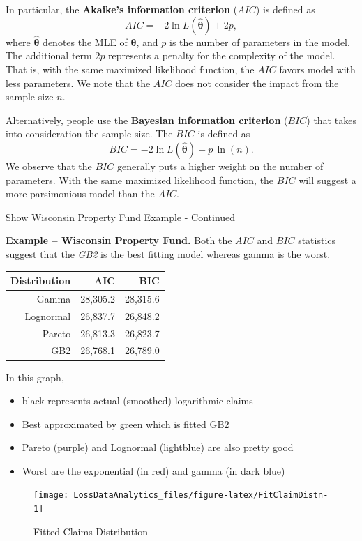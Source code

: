 \documentclass[]{book}
\theoremstyle{definition}
\theoremstyle{definition}
\theoremstyle{definition}
\theoremstyle{remark}
\begin{document}
In particular, the \textbf{Akaike's information criterion} (\(AIC\)) is
defined as \[AIC = -2\ln L(\hat{\boldsymbol \theta}) + 2p,\] where
\(\hat{\boldsymbol \theta}\) denotes the MLE of
\({\boldsymbol \theta}\), and \(p\) is the number of parameters in the
model. The additional term \(2 p\) represents a penalty for the
complexity of the model. That is, with the same maximized likelihood
function, the \(AIC\) favors model with less parameters. We note that
the \(AIC\) does not consider the impact from the sample size \(n\).

Alternatively, people use the \textbf{Bayesian information criterion}
(\(BIC\)) that takes into consideration the sample size. The \(BIC\) is
defined as \[BIC = -2\ln L(\hat{\boldsymbol \theta}) + p\,\ln(n).\] We
observe that the \(BIC\) generally puts a higher weight on the number of
parameters. With the same maximized likelihood function, the \(BIC\)
will suggest a more parsimonious model than the \(AIC\).

Show Wisconsin Property Fund Example - Continued

\hypertarget{EXM:S1:AIC}{}
\textbf{Example -- Wisconsin Property Fund.} Both the \(AIC\) and
\(BIC\) statistics suggest that the \emph{GB2} is the best fitting model
whereas gamma is the worst.

\begin{longtable}[]{@{}rrr@{}}
\toprule
Distribution & AIC & BIC\tabularnewline
\midrule
\endhead
Gamma & 28,305.2 & 28,315.6\tabularnewline
Lognormal & 26,837.7 & 26,848.2\tabularnewline
Pareto & 26,813.3 & 26,823.7\tabularnewline
GB2 & 26,768.1 & 26,789.0\tabularnewline
\bottomrule
\end{longtable}

In this graph,

\begin{itemize}
\item
  black represents actual (smoothed) logarithmic claims
\item
  Best approximated by green which is fitted GB2
\item
  Pareto (purple) and Lognormal (lightblue) are also pretty good
\item
  Worst are the exponential (in red) and gamma (in dark blue)
\end{itemize}

\begin{figure}

{\centering \texttt{[image: LossDataAnalytics\_files/figure-latex/FitClaimDistn-1]} 

}

\caption{Fitted Claims Distribution}\label{fig:FitClaimDistn}
\end{figure}
\end{document}
